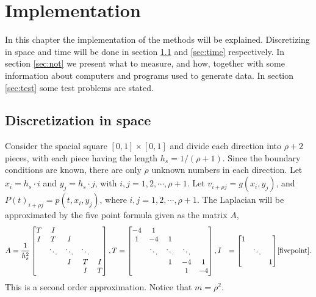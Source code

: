 \chapter{Implementation}%
\label{sec:imp}
In this chapter the implementation of the methods will be explained. Discretizing in space and time will be done in section \ref{sec:space} and \ref{sec:time} respectively.
In section \ref{sec:not} we present what to measure, and how, together with some information about computers and programs used to generate data.
In section \ref{sec:test} some test problems are stated.

\section{Discretization in space} \label{sec:space}
Consider the spacial square $[0,1] \times [0,1]$ and divide each direction into $\rho+2$ pieces, with each piece having the length $h_s = 1/(\rho+1)$. Since the boundary conditions are known, there are only $\rho$ unknown numbers in each direction. Let $x_i = h_s \cdot i$ and $y_j = h_s \cdot j$, with $i,j =1,2,\cdots, \rho + 1 $. 
Let  $v_{i+\rho j} = g(x_i, y_j)$, and $P(t)_{i+\rho j} = p(t,x_i, y_j)$, where $i,j = 1,2,\cdots, \rho+1$.
The Laplacian will be approximated by the five point formula given as the matrix $A$, 
\begin{equation} \label{eqn:fivepoint} 
\begin{aligned} 
A = \frac{1}{h_s^2} 
\begin{bmatrix}
T & I & & &\\
I& T & I & &\\
& \ddots & \ddots & \ddots & \\
& & I& T & I\\
& & & I & T
\end{bmatrix}
, T  &= 
\begin{bmatrix}
-4 & 1 & & &\\
1 & -4 & 1 & &  \\
& \ddots & \ddots & \ddots & \\
&  & 1 & -4 & 1 \\
 & & & 1 & -4
\end{bmatrix},
I &= 
\begin{bmatrix}
1 & &\\
& \ddots & \\
& & 1 \\
\end{bmatrix}
\end{aligned}\cite{fivepoint}.
\end{equation} 
This is a second order approximation.
Notice that $m = \rho ^2$.

